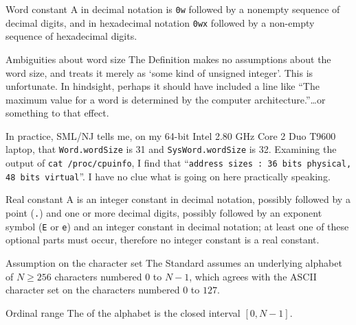 \begin{definition}{Word constant}
A  in decimal notation is \texttt{0w} followed by
a nonempty sequence of decimal digits, and in hexadecimal notation
\texttt{0wx} followed by a non-empty sequence of hexadecimal digits.
\end{definition}

\begin{remark}{Ambiguities about word size}
The Definition makes no assumptions about the word size, and treats it
merely as `some kind of unsigned integer'. This is unfortunate. In
hindsight, perhaps it should have included a line like ``The maximum
value for a word is determined by the computer architecture.''\dots or
something to that effect.

In practice, SML/NJ tells me, on my 64-bit Intel 2.80 GHz Core 2 Duo
T9600 laptop, that \texttt{Word.wordSize} is 31 and \texttt{SysWord.wordSize} is 32.
Examining the output of \texttt{cat /proc/cpuinfo}, I find that ``\texttt{address sizes   : 36 bits physical, 48 bits virtual}''.
I have no clue what is going on here practically speaking.
\end{remark}

\begin{definition}{Real constant}
A  is an integer constant in decimal notation,
possibly followed by a point (\texttt{.}) and one or more decimal
digits, possibly followed by an exponent symbol (\texttt{E} or
\texttt{e}) and an integer constant in decimal notation; at least one of
these optional parts must occur, therefore no integer constant is a real
constant. 
\end{definition}

\begin{clause}{Assumption on the character set}
The Standard assumes an underlying alphabet of $N\geq256$ characters
numbered $0$ to $N-1$, which agrees with the ASCII character set on the
characters numbered $0$ to $127$.
\end{clause}

\begin{definition}{Ordinal range}
The  of the alphabet is the closed interval $[0,N-1]$.
\end{definition}

